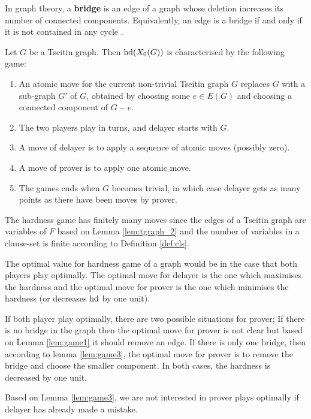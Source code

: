 \documentclass[]{book}
\begin{document}
\begin{defi}\label{def:bridge}
      In graph theory, a \textbf{bridge} is an edge of a graph whose deletion increases its number of connected components. Equivalently, 
	  an edge is a bridge if and only if it is not contained in any cycle \cite{h15}.  
\end{defi}

\begin{lem}\label{lem:game1}
      Let $G$ be a Tseitin graph. Then $\operatorname{hd}(X_0(G))$ is characterised by the following game:
	  \begin{enumerate}
	  \item An atomic move for the current non-trivial Tseitin graph $G$ replaces $G$ with a sub-graph $G'$ of $G$, obtained by choosing 
	  some $e \in E(G)$ and choosing a connected component of $G - e$.
	  \item The two players play in turns, and delayer starts with $G$.
	  \item A move of delayer is to apply a sequence of atomic moves (possibly zero).
	  \item A move of prover is to apply one atomic move.
	  \item The games ends when $G$ becomes trivial, in which case delayer gets as many points as there have been moves by prover.
	  \end{enumerate}
\end{lem} 
\begin{lem}\label{lem:game2}
      The hardness game has finitely many moves since the edges of a Tseitin graph are variables of $F$ based on Lemma \ref{lem:tgraph_2} and 
	  the number of variables in a clause-set is finite according to Definition \ref{def:cls}.
\end{lem}
\begin{lem}\label{lem:game3}
      The optimal value for hardness game of a graph would be in the case that both players play optimally. The optimal move for delayer 
	  is the one which maximises the hardness and the optimal move for prover is the one which minimises the hardness (or decreases $\operatorname{hd}$ by one unit).
\end{lem}
\begin{lem}\label{lem:game6}
      If both player play optimally, there are two possible situations for prover; If there is no bridge in the graph then the optimal move for 
	  prover is not clear but based on Lemma \ref{lem:game1} it should remove an edge. If there is only one bridge, then according to lemma 
	  \ref{lem:game3}, the optimal move for prover is to remove the bridge and choose the smaller component. In both cases, the hardness is 
	  decreased by one unit. 
\end{lem}
\begin{lem}\label{lem:game4}
      Based on Lemma \ref{lem:game3}, we are not interested in prover plays optimally if delayer has already made a mistake.
\end{lem}
\end{document}
